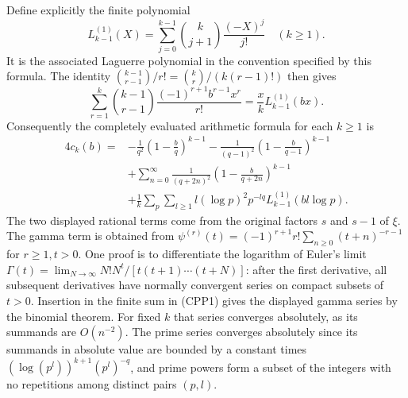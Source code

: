 Define explicitly the finite polynomial
\begin{equation}\tag{CPP4}
 L_{k-1}^{(1)}(X)=\sum_{j=0}^{k-1}\binom{k}{j+1}
                         \frac{(-X)^j}{j!}\quad(k\ge1).
\end{equation}
It is the associated Laguerre polynomial in the convention
specified by this formula. The identity
$\binom{k-1}{r-1}/r!=\binom{k}{r}/(k(r-1)!)$
then gives
\[
 \sum_{r=1}^k\binom{k-1}{r-1}
       \frac{(-1)^{r+1}b^{r-1}x^r}{r!}
           =\frac{x}{k}L_{k-1}^{(1)}(bx).
\]
Consequently the completely evaluated arithmetic formula for
each $k\ge1$ is
\begin{equation}\tag{CPP5}
\begin{split}
 4c_k(b)={}&
  -\frac1{q^2}\left(1-\frac bq\right)^{k-1}
  -\frac1{(q-1)^2}\left(1-\frac b{q-1}\right)^{k-1}\\
 &+\sum_{n=0}^\infty\frac1{(q+2n)^2}
                         \left(1-\frac b{q+2n}\right)^{k-1}\\
 &+\frac1k\sum_p\sum_{l\ge1}
       l(\log p)^2p^{-lq}L_{k-1}^{(1)}(bl\log p).
\end{split}
\end{equation}
The two displayed rational terms come from the original factors
$s$ and $s-1$ of $\xi$. The gamma term is obtained from
$\psi^{(r)}(t)=(-1)^{r+1}r!\sum_{n\ge0}(t+n)^{-r-1}$ for
$r\ge1,t>0$. One proof is to differentiate the logarithm of
Euler's limit
$\Gamma(t)=\lim_{N\to\infty}N!N^t/[t(t+1)\cdots(t+N)]$:
after the first derivative, all subsequent derivatives have
normally convergent series on compact subsets of $t>0$.
Insertion in the finite sum in (CPP1) gives the displayed
gamma series by the binomial theorem. For fixed $k$ that series
converges absolutely, as its summands are $O(n^{-2})$.
The prime series converges absolutely since its summands in
absolute value are bounded by a constant times
$(\log(p^l))^{k+1}(p^l)^{-q}$, and prime powers form a subset
of the integers with no repetitions among distinct pairs $(p,l)$.

